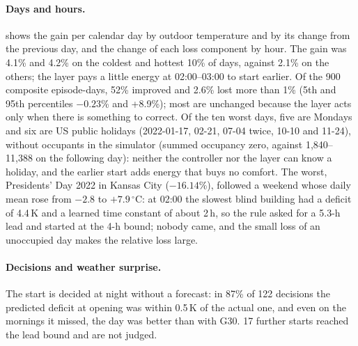\paragraph{Days and hours.}  shows the gain per calendar day by outdoor temperature and by its change from the previous day, and the
change of each loss component by hour. The gain was 4.1\% and 4.2\% on the coldest and hottest 10\% of days, against
2.1\% on the others; the layer pays a little energy at 02:00--03:00 to start earlier. Of the 900 composite episode-days,
52\% improved and 2.6\% lost more than 1\% (5th and 95th percentiles $-0.23$\% and +8.9\%); most are unchanged because the
layer acts only when there is something to correct. Of the ten worst days, five are Mondays and six are US public holidays (2022-01-17, 02-21, 07-04 twice, 10-10 and 11-24),
without occupants in the simulator (summed occupancy zero, against 1,840--11,388 on the following day): neither the
controller nor the layer can know a holiday, and the earlier start adds energy that buys no comfort. The worst, Presidents'
Day 2022 in Kansas City ($-16.14$\%), followed a weekend whose daily mean rose from $-2.8$ to $+7.9\,^\circ$C: at 02:00 the
slowest blind building had a deficit of 4.4\,K and a learned time constant of about 2\,h, so the rule asked for a 5.3-h lead
and started at the 4-h bound; nobody came, and the small loss of an unoccupied day makes the relative loss large.
\paragraph{Decisions and weather surprise.}
The start is decided at night without a forecast: in 87\% of 122 decisions the predicted deficit at opening was within
0.5\,K of the actual one, and even on the mornings it missed, the day was better than with G30.
17 further starts reached the lead bound and are not judged.
